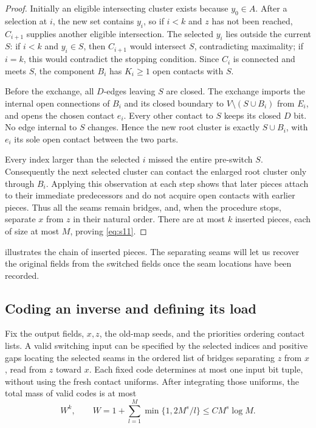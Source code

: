 \begin{proof}
Initially an eligible intersecting cluster exists because $y_0\in A$.
After a selection at $i$, the new set contains $y_i$, so if $i<k$ and
$z$ has not been reached, $C_{i+1}$ supplies another eligible intersection.
The selected $y_i$ lies outside the current $S$: if $i<k$ and $y_i\in S$,
then $C_{i+1}$ would intersect $S$, contradicting maximality; if $i=k$,
this would contradict the stopping condition.  Since $C_i$ is connected
and meets $S$, the component $B_i$ has $K_i\ge1$ open contacts with $S$.

Before the exchange, all $D$-edges leaving $S$ are closed.  The exchange
imports the internal open connections of $B_i$ and its closed boundary
to $V\setminus(S\cup B_i)$ from $E_i$, and opens the chosen contact
$e_i$.  Every other contact to $S$ keeps its closed $D$ bit.  No edge
internal to $S$ changes.  Hence the new root cluster is exactly
$S\cup B_i$, with $e_i$ its sole open contact between the two parts.

Every index larger than the selected $i$ missed the entire pre-switch
$S$.  Consequently the next selected cluster can contact the enlarged
root cluster only through $B_i$.  Applying this observation at each step
shows that later pieces attach to their immediate predecessors and do
not acquire open contacts with earlier pieces.  Thus all the seams
remain bridges, and, when the procedure stops, separate $x$ from
$z$ in their natural order.  There are at most $k$ inserted pieces,
each of size at most $M$, proving \eqref{eq:s11}.
\end{proof}

 illustrates the chain of inserted pieces.  The
separating seams will let us recover the original fields from the
switched fields once the seam locations have been recorded.


\subsection{Coding an inverse and defining its load}\label{amp:coding-section}

\begin{lemma}\label{amp:coding}
Fix the output fields, $x,z$, the old-map seeds, and the priorities
ordering contact lists.  A valid switching input can be specified by the
selected indices and positive gaps locating the selected seams in the
ordered list of bridges separating $z$ from $x$, read from $z$ toward
$x$.  Each fixed code determines at most one input bit tuple, without
using the fresh contact uniforms.  After integrating those uniforms, the
total mass of valid codes is at most
\begin{equation}\label{eq:s12}
 W^k,\qquad
 W=1+\sum_{l=1}^{M}\min\{1,2M^s/l\}
       \le C M^s\log M.
\end{equation}
\end{lemma}

